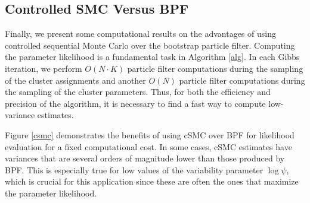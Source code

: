 \documentclass[twoside]{article}
\begin{document}
%


\subsection{Controlled SMC Versus BPF}
Finally, we present some computational results on the advantages of using controlled sequential Monte Carlo over the bootstrap particle filter. Computing the parameter likelihood is a fundamental task in Algorithm \ref{alg}. In each Gibbs iteration, we perform $O(N \cdot K)$ particle filter computations during the sampling of the cluster assignments and another $O(N)$ particle filter computations during the sampling of the cluster parameters. Thus, for both the efficiency and precision of the algorithm, it is necessary to find a fast way to compute low-variance estimates. 

Figure \ref{csmc} demonstrates the benefits of using cSMC over BPF for likelihood evaluation for a fixed computational cost.  In some cases, cSMC estimates have variances that are several orders of magnitude lower than those produced by BPF.  This is especially true for low values of the variability parameter $\log \psi$, which is crucial for this application since these are often the ones that maximize the parameter likelihood.  
\end{document}
